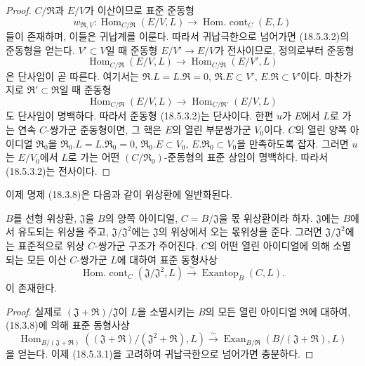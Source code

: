 \begin{proof}
$C/\mathfrak R$과 $E/V$가 이산이므로 표준 준동형
\[
  w_{\mathfrak R,V}:\operatorname{Hom}_{C/\mathfrak R}(E/V,L)
  \longrightarrow\operatorname{Hom.\ cont}_C(E,L)
\]
들이 존재하며, 이들은 귀납계를 이룬다. 따라서 귀납극한으로 넘어가면
(18.5.3.2)의 준동형을 얻는다. $V'\subset V$일 때 준동형
$E/V'\to E/V$가 전사이므로, 정의로부터 준동형
\[
  \operatorname{Hom}_{C/\mathfrak R}(E/V,L)
  \longrightarrow\operatorname{Hom}_{C/\mathfrak R}(E/V',L)
\]
은 단사임이 곧 따른다. 여기서는
$\mathfrak R.L=L.\mathfrak R=0$, $\mathfrak R.E\subset V'$,
$E.\mathfrak R\subset V'$이다. 마찬가지로
$\mathfrak R'\subset\mathfrak R$일 때 준동형
\[
  \operatorname{Hom}_{C/\mathfrak R}(E/V,L)
  \longrightarrow\operatorname{Hom}_{C/\mathfrak R'}(E/V,L)
\]
도 단사임이 명백하다. 따라서 준동형 (18.5.3.2)는 단사이다.
한편 $u$가 $E$에서 $L$로 가는 연속 $C$-쌍가군 준동형이면, 그 핵은
$E$의 열린 부분쌍가군 $V_0$이다. $C$의 열린 양쪽 아이디얼
$\mathfrak R_0$을
$\mathfrak R_0.L=L.\mathfrak R_0=0$,
$\mathfrak R_0.E\subset V_0$, $E.\mathfrak R_0\subset V_0$을
만족하도록 잡자. 그러면 $u$는 $E/V_0$에서 $L$로 가는 어떤
$(C/\mathfrak R_0)$-준동형의 표준 상임이 명백하다. 따라서
(18.5.3.2)는 전사이다.
\end{proof}

이제 명제 (18.3.8)은 다음과 같이 위상환에 일반화된다.

\begin{proposition}[18.5.4]
\label{0.18.5.4-fr}
$B$를 선형 위상환, $\mathfrak J$을 $B$의 양쪽 아이디얼,
$C=B/\mathfrak J$을 몫 위상환이라 하자. $\mathfrak J$에는 $B$에서
유도되는 위상을 주고, $\mathfrak J/\mathfrak J^2$에는
$\mathfrak J$의 위상에서 오는 몫위상을 준다. 그러면
$\mathfrak J/\mathfrak J^2$에는 표준적으로 위상 $C$-쌍가군 구조가
주어진다. $C$의 어떤 열린 아이디얼에 의해 소멸되는 모든 이산
$C$-쌍가군 $L$에 대하여 표준 동형사상
\begin{equation}
\label{0.18.5.4.1-fr}
\tag{18.5.4.1}
  \operatorname{Hom.\ cont}_C(\mathfrak J/\mathfrak J^2,L)
  \xrightarrow{\sim}\operatorname{Exantop}_B(C,L).
\end{equation}
이 존재한다.
\end{proposition}

\begin{proof}
실제로 $(\mathfrak J+\mathfrak R)/\mathfrak J$이 $L$을 소멸시키는
$B$의 모든 열린 아이디얼 $\mathfrak R$에 대하여, (18.3.8)에 의해
표준 동형사상
\[
  \operatorname{Hom}_{B/(\mathfrak J+\mathfrak R)}
    ((\mathfrak J+\mathfrak R)/(\mathfrak J^2+\mathfrak R),L)
  \xrightarrow{\sim}
  \operatorname{Exan}_{B/\mathfrak R}(B/(\mathfrak J+\mathfrak R),L)
\]
을 얻는다. 이제 (18.5.3.1)을 고려하여 귀납극한으로 넘어가면 충분하다.
\end{proof}

